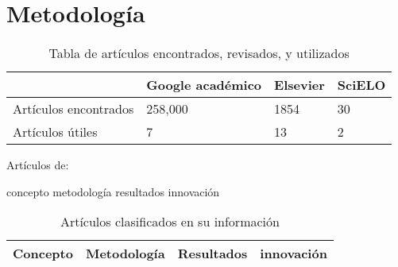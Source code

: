 \section{Metodología}
\lipsum[1-2]
\begin{table}[H]
   \caption{Tabla de artículos encontrados, revisados, y utilizados}
   \label{tab:articulos}
   \begin{center}
      \begin{tabular}{l|l l l}
         \hline
         ~ & Google académico & Elsevier & SciELO\\
         \hline
         Artículos encontrados & 258,000 & 1854 & 30\\
         \hline
         Artículos útiles & 7 & 13 & 2\\
         \hline
      \end{tabular}
   \end{center}
\end{table}

Artículos de:

concepto metodología resultados innovación

\begin{table}[H]
   \caption{Artículos clasificados en su información}
   \label{tab:articulos-concepto-metod-res-inn}
   \begin{center}
      \begin{tabular}{|c|c|c|c|}
         \hline
         Concepto & Metodología & Resultados & innovación\\
         \hline
      \end{tabular}
   \end{center}
\end{table}

